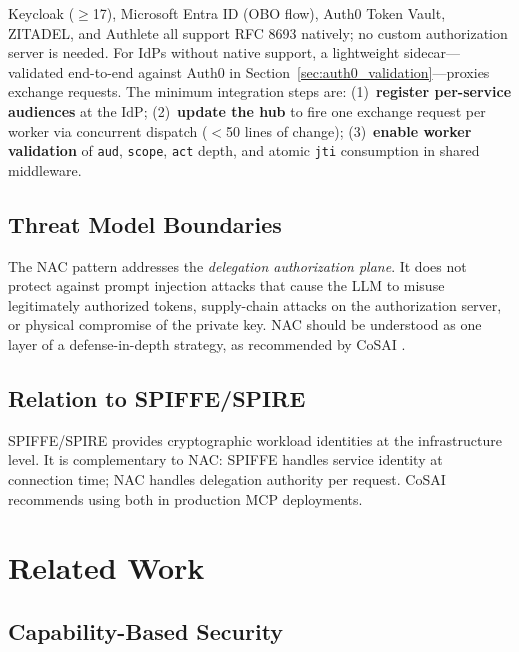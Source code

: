 \documentclass[journal]{IEEEtran}
\theoremstyle{definition}
\begin{document}
Keycloak ($\geq$17), Microsoft Entra ID (OBO flow), Auth0 Token Vault, ZITADEL,
and Authlete all support RFC 8693 natively; no custom authorization server is
needed. For IdPs without native support, a lightweight sidecar---validated
end-to-end against Auth0 in Section~\ref{sec:auth0_validation}---proxies
exchange requests. The minimum integration steps are:
(1)~\textbf{register per-service audiences} at the IdP;
(2)~\textbf{update the hub} to fire one exchange request per worker
via concurrent dispatch ($<$50 lines of change);
(3)~\textbf{enable worker validation} of \texttt{aud}, \texttt{scope}, \texttt{act}
depth, and atomic \texttt{jti} consumption in shared middleware.

\subsection{Threat Model Boundaries}

The NAC pattern addresses the \textit{delegation authorization plane}. It does
not protect against prompt injection attacks that cause the LLM to misuse
legitimately authorized tokens, supply-chain attacks on the authorization server,
or physical compromise of the private key. NAC should be understood as one layer
of a defense-in-depth strategy, as recommended by CoSAI \cite{cosai_mcp}.

\subsection{Relation to SPIFFE/SPIRE}

SPIFFE/SPIRE \cite{spiffe} provides cryptographic workload identities at the
infrastructure level. It is complementary to NAC: SPIFFE handles service
identity at connection time; NAC handles delegation authority per request. CoSAI
\cite{cosai_mcp} recommends using both in production MCP deployments.


\FloatBarrier  %

\section{Related Work}
\label{sec:related}

\subsection{Capability-Based Security}
\end{document}
